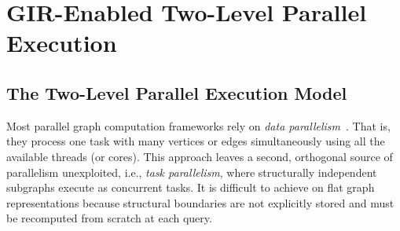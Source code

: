 \section{GIR-Enabled Two-Level Parallel Execution}
\label{sec:task_parallel}














\subsection{The Two-Level Parallel Execution Model}
\label{subsec:framework}

Most parallel graph computation frameworks rely on \textit{data parallelism}~\cite{Shun2013Ligra,Wang2016Gunrock,Zhang2018GraphIt}. That is, they process one task with many vertices or edges simultaneously using all the available threads (or cores).
This approach leaves a second, orthogonal source of parallelism unexploited, i.e., 
\textit{task parallelism}, where structurally independent subgraphs execute as concurrent tasks.
It is difficult to achieve on flat graph representations because structural boundaries are not explicitly stored and must be recomputed from scratch at each query.

